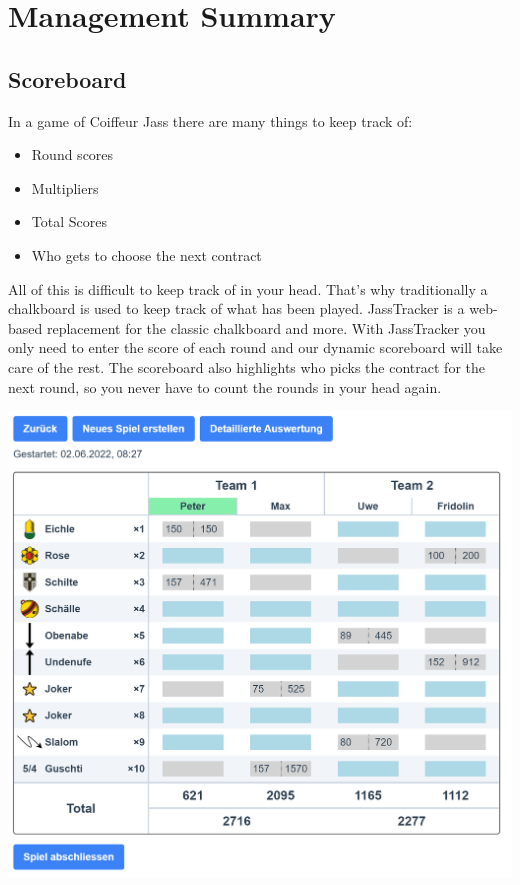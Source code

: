 \chapter*{Management Summary}

\section*{Scoreboard}
In a game of Coiffeur Jass there are many things to keep track of:

\begin{itemize}
    \item Round scores
    \item Multipliers
    \item Total Scores
    \item Who gets to choose the next contract
\end{itemize}

All of this is difficult to keep track of in your head. That's why traditionally a chalkboard is used to keep track of what has been played. JassTracker is a web-based replacement for the classic chalkboard and more. With JassTracker you only need to enter the score of each round and our dynamic scoreboard will take care of the rest. The scoreboard also highlights who picks the contract for the next round, so you never have to count the rounds in your head again.

\includegraphics[height=0.4\textheight]{resources/screenshots/scoreboard}

